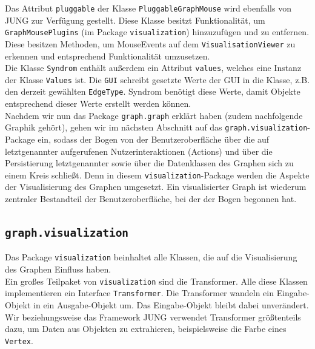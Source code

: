 \documentclass[enabledeprecatedfontcommands,fontsize=11pt,paper=a4,twoside]{scrartcl}
\newcounter{one}
\begin{document}
	Das Attribut \texttt{pluggable} der Klasse \texttt{PluggableGraphMouse} wird ebenfalls von JUNG zur Verfügung gestellt. Diese Klasse besitzt Funktionalität, um \texttt{GraphMousePlugins} (im Package \texttt{visualization}) hinzuzufügen und zu entfernen. Diese besitzen Methoden, um MouseEvents auf dem \texttt{VisualisationViewer} zu erkennen und entsprechend Funktionalität umzusetzen. \\
	
	Die Klasse \texttt{Syndrom} enthält außerdem ein Attribut \texttt{values}, welches eine Instanz der Klasse \texttt{Values} ist. Die \texttt{GUI} schreibt gesetzte Werte der GUI in die Klasse, z.B. den derzeit gewählten \texttt{EdgeType}. Syndrom benötigt diese Werte, damit Objekte entsprechend dieser Werte erstellt werden können. \\
	
	
	
	Nachdem wir nun das Package \texttt{graph.graph} erklärt haben (zudem nachfolgende Graphik gehört), gehen wir im nächsten Abschnitt auf das \texttt{graph.visualization}-Package ein, sodass der Bogen von der Benutzeroberfläche über die auf letztgenannter aufgerufenen Nutzerinteraktionen (Actions) und über die Persistierung letztgenannter sowie über die Datenklassen des Graphen sich zu einem Kreis schließt. Denn in diesem \texttt{visualization}-Package werden die Aspekte der Visualisierung des Graphen umgesetzt. Ein visualisierter Graph ist wiederum zentraler Bestandteil der Benutzeroberfläche, bei der der Bogen begonnen hat.
	
	
	
	\newpage
	
	
	
	
	\subsection{\texttt{graph.visualization}}
	
	Das Package \texttt{visualization} beinhaltet alle Klassen, die auf die Visualisierung des Graphen Einfluss haben. \\
	
	Ein großes Teilpaket von \texttt{visualization} sind die Transformer.  Alle diese Klassen implementieren ein Interface \texttt{Transformer}. Die Transformer wandeln ein Eingabe-Objekt in ein Ausgabe-Objekt um. Das Eingabe-Objekt bleibt dabei unverändert. Wir beziehungsweise das Framework JUNG verwendet Transformer größtenteils dazu, um Daten aus Objekten zu extrahieren, beispielsweise die Farbe eines \texttt{Vertex}. \\
	
\end{document}
